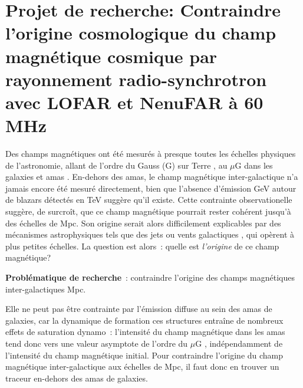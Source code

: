 



\section{Projet de recherche: Contraindre l'origine cosmologique du champ magn\'etique cosmique par rayonnement radio-synchrotron avec LOFAR et NenuFAR \`a 60\,MHz}






\pg
Des champs magn\'etiques ont \'et\'e mesur\'es \`a presque	 toutes les \'echelles physiques de l'astronomie, allant de l'ordre du Gauss (G) sur Terre \cite{2010SSRv..152..159H}, au $\mu$G dans les galaxies \citep{2013pss5.book..641B} et amas \citep{2019SSRv..215...16V}. En-dehors des amas, le champ magn\'etique inter-galactique n'a jamais encore \'et\'e mesur\'e directement, bien que l'absence d'\'emission GeV autour de blazars d\'etect\'es en TeV \cite{2010Sci...328...73N} sugg\`ere qu'il existe. Cette contrainte observationelle sugg\`ere, de surcro\^it, que ce champ magn\'etique pourrait rester coh\'erent jusqu'\`a des \'echelles de Mpc. Son origine serait alors difficilement explicables par des m\'ecanismes astrophysiques tels que des jets \citep{2001ApJ...556..619F} ou vents galactiques \citep{2006MNRAS.370..319B}, qui op\`erent \`a plus petites \'echelles. La question est alors~: quelle est \textit{l'origine} de ce champ magn\'etique?


\begin{tcolorbox}[colback=green!10, colframe=green!50!black, arc=3mm, boxrule=1pt]
	\textbf{Probl\'ematique de recherche}~: contraindre l'origine des champs magn\'etiques inter-galactiques Mpc. 
\end{tcolorbox}

Elle ne peut pas \^etre contrainte par l'\'emission diffuse au sein des amas de galaxies, car la dynamique de formation ces structures entra\^ine de nombreux effets de saturation dynamo~: l'intensit\'e du champ magn\'etique dans les amas tend donc vers une valeur asymptote de l'ordre du $\mu$G \citep{2013A&ARv..21...62D}, ind\'ependamment de l'intensit\'e du champ magn\'etique initial. Pour contraindre l'origine du champ magn\'etique inter-galactique aux \'echelles de Mpc, il faut donc en trouver un traceur en-dehors des amas de galaxies.

